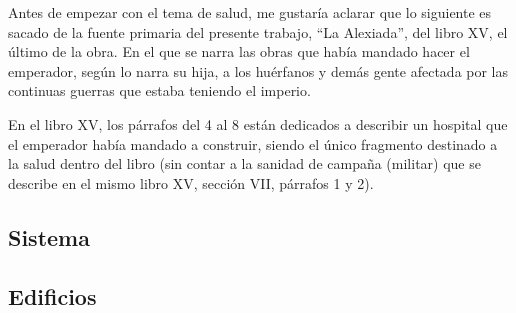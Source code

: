 

Antes de empezar con el tema de salud, me gustaría aclarar 
que lo siguiente es sacado de la fuente primaria del 
presente trabajo, “La Alexiada”, del libro XV, el último de la obra. 
En el que se narra las obras que había mandado hacer el emperador, 
según lo narra su hija, a los huérfanos y demás gente afectada 
por las continuas guerras que estaba teniendo el imperio.

En el libro XV, los párrafos del 4 al 8 están dedicados a 
describir un hospital que el emperador había mandado a construir, 
siendo el único fragmento destinado a la salud dentro del libro 
(sin contar a la sanidad de campaña (militar) que se describe 
en el mismo libro XV, sección VII, párrafos 1 y 2).

\subsection{Sistema}

\subsection{Edificios}


